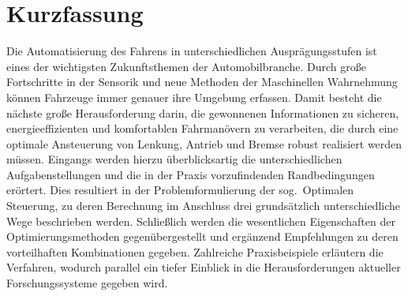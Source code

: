 \chapter*{Kurzfassung}
Die Automatisierung des Fahrens in unterschiedlichen Ausprägungsstufen ist eines der wichtigsten Zukunftsthemen der Automobilbranche. Durch große Fortschritte in der Sensorik und neue Methoden der Maschinellen Wahrnehmung können Fahrzeuge immer genauer ihre Umgebung erfassen. Damit besteht die nächste große Herausforderung darin, die gewonnenen Informationen zu sicheren, energieeffizienten und komfortablen Fahrmanövern zu verarbeiten, die durch eine optimale Ansteuerung von Lenkung, Antrieb und Bremse robust realisiert werden müssen. Eingangs werden hierzu überblicksartig die unterschiedlichen Aufgabenstellungen und die in der Praxis vorzufindenden Randbedingungen erörtert. Dies resultiert in der Problemformulierung der sog.\ Optimalen Steuerung, zu deren Berechnung im Anschluss drei grundsätzlich unterschiedliche Wege beschrieben werden. Schließlich werden die wesentlichen Eigenschaften der Optimierungsmethoden gegenübergestellt und ergänzend Empfehlungen zu deren vorteilhaften Kombinationen gegeben. Zahlreiche Praxisbeispiele erläutern die Verfahren, wodurch parallel ein tiefer Einblick in die Herausforderungen aktueller Forschungssysteme gegeben wird.





